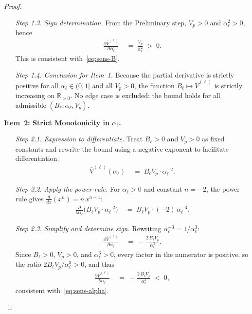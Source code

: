 \documentclass[12pt,openany]{book}
\numberwithin{equation}{chapter}
\theoremstyle{plain}
\theoremstyle{definition}
\theoremstyle{remark}
\begin{document}
\begin{proof}
\begin{enumerate}
  \item[\textit{Step 1.3.}] \emph{Sign determination.}
        From the Preliminary step, $V_p > 0$ and
        $\alpha_\ell^2 > 0$, hence
        \begin{align}
          \frac{\partial \overline{V}^{(\ell)}}{\partial B_\ell}
          &\;=\; \frac{V_p}{\alpha_\ell^2}
          \;>\; 0.
        \end{align}
        This is consistent with~\eqref{eq:sens-B}.

  \item[\textit{Step 1.4.}] \emph{Conclusion for Item~1.}
        Because the partial derivative is strictly positive for
        all $\alpha_\ell \in (0,1]$ and all $V_p > 0$, the
        function $B_\ell \mapsto \overline{V}^{(\ell)}$ is
        strictly increasing on $\mathbb{R}_{>0}$.
        No edge case is excluded: the bound holds for all
        admissible $(B_\ell, \alpha_\ell, V_p)$.
\end{enumerate}

\noindent\textbf{Item~2: Strict Monotonicity in $\alpha_\ell$.}
\begin{enumerate}
  \item[\textit{Step 2.1.}] \emph{Expression to differentiate.}
        Treat $B_\ell > 0$ and $V_p > 0$ as fixed constants
        and rewrite the bound using a negative exponent to
        facilitate differentiation:
        \begin{align}
          \overline{V}^{(\ell)}(\alpha_\ell)
          &\;=\; B_\ell V_p \cdot \alpha_\ell^{-2}.
        \end{align}

  \item[\textit{Step 2.2.}] \emph{Apply the power rule.}
        For $\alpha_\ell > 0$ and constant $n = -2$, the power
        rule gives $\frac{d}{dx}(x^n) = n\,x^{n-1}$:
        \begin{align}
          \frac{\partial}{\partial \alpha_\ell}
          \bigl(B_\ell V_p \cdot \alpha_\ell^{-2}\bigr)
          &\;=\; B_\ell V_p \cdot (-2)\,\alpha_\ell^{-3}.
        \end{align}

  \item[\textit{Step 2.3.}] \emph{Simplify and determine sign.}
        Rewriting $\alpha_\ell^{-3} = 1/\alpha_\ell^3$:
        \begin{align}
          \frac{\partial \overline{V}^{(\ell)}}{\partial \alpha_\ell}
          &\;=\; -\frac{2\,B_\ell V_p}{\alpha_\ell^3}.
        \end{align}
        Since $B_\ell > 0$, $V_p > 0$, and $\alpha_\ell^3 > 0$,
        every factor in the numerator is positive, so the ratio
        $2 B_\ell V_p / \alpha_\ell^3 > 0$, and thus
        \begin{align}
          \frac{\partial \overline{V}^{(\ell)}}{\partial \alpha_\ell}
          &\;=\; -\frac{2\,B_\ell V_p}{\alpha_\ell^3}
          \;<\; 0,
        \end{align}
        consistent with~\eqref{eq:sens-alpha}.


\end{enumerate}
\end{proof}
\end{document}
